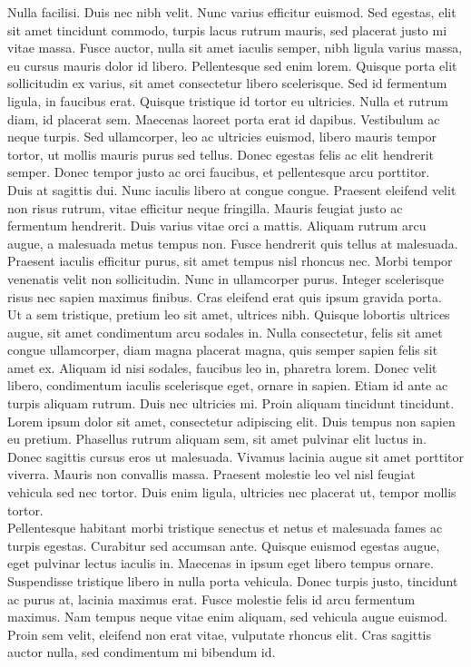 Nulla facilisi. Duis nec nibh velit. Nunc varius efficitur euismod. Sed egestas, elit sit amet tincidunt commodo, turpis lacus rutrum mauris, sed placerat justo mi vitae massa. Fusce auctor, nulla sit amet iaculis semper, nibh ligula varius massa, eu cursus mauris dolor id libero. Pellentesque sed enim lorem. Quisque porta elit sollicitudin ex varius, sit amet consectetur libero scelerisque. Sed id fermentum ligula, in faucibus erat. Quisque tristique id tortor eu ultricies. Nulla et rutrum diam, id placerat sem. Maecenas laoreet porta erat id dapibus. Vestibulum ac neque turpis. Sed ullamcorper, leo ac ultricies euismod, libero mauris tempor tortor, ut mollis mauris purus sed tellus. Donec egestas felis ac elit hendrerit semper. Donec tempor justo ac orci faucibus, et pellentesque arcu porttitor.\\

Duis at sagittis dui. Nunc iaculis libero at congue congue. Praesent eleifend velit non risus rutrum, vitae efficitur neque fringilla. Mauris feugiat justo ac fermentum hendrerit. Duis varius vitae orci a mattis. Aliquam rutrum arcu augue, a malesuada metus tempus non. Fusce hendrerit quis tellus at malesuada. Praesent iaculis efficitur purus, sit amet tempus nisl rhoncus nec. Morbi tempor venenatis velit non sollicitudin. Nunc in ullamcorper purus. Integer scelerisque risus nec sapien maximus finibus. Cras eleifend erat quis ipsum gravida porta.\\

Ut a sem tristique, pretium leo sit amet, ultrices nibh. Quisque lobortis ultrices augue, sit amet condimentum arcu sodales in. Nulla consectetur, felis sit amet congue ullamcorper, diam magna placerat magna, quis semper sapien felis sit amet ex. Aliquam id nisi sodales, faucibus leo in, pharetra lorem. Donec velit libero, condimentum iaculis scelerisque eget, ornare in sapien. Etiam id ante ac turpis aliquam rutrum. Duis nec ultricies mi. Proin aliquam tincidunt tincidunt. Lorem ipsum dolor sit amet, consectetur adipiscing elit. Duis tempus non sapien eu pretium. Phasellus rutrum aliquam sem, sit amet pulvinar elit luctus in. Donec sagittis cursus eros ut malesuada. Vivamus lacinia augue sit amet porttitor viverra. Mauris non convallis massa. Praesent molestie leo vel nisl feugiat vehicula sed nec tortor. Duis enim ligula, ultricies nec placerat ut, tempor mollis tortor.\\

Pellentesque habitant morbi tristique senectus et netus et malesuada fames ac turpis egestas. Curabitur sed accumsan ante. Quisque euismod egestas augue, eget pulvinar lectus iaculis in. Maecenas in ipsum eget libero tempus ornare. Suspendisse tristique libero in nulla porta vehicula. Donec turpis justo, tincidunt ac purus at, lacinia maximus erat. Fusce molestie felis id arcu fermentum maximus. Nam tempus neque vitae enim aliquam, sed vehicula augue euismod. Proin sem velit, eleifend non erat vitae, vulputate rhoncus elit. Cras sagittis auctor nulla, sed condimentum mi bibendum id.\\

